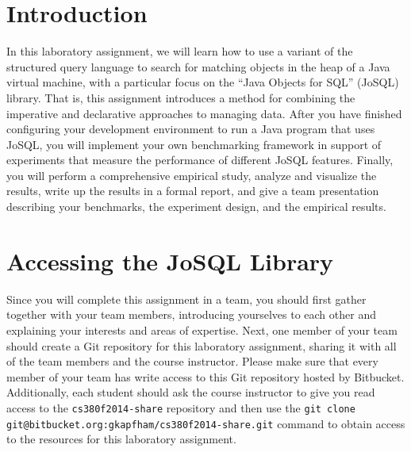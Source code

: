 


\usepackage[compact]{titlesec}



\section*{Introduction}

In this laboratory assignment, we will learn how to use a variant of the structured query language to search for
matching objects in the heap of a Java virtual machine, with a particular focus on the ``Java Objects for SQL'' (JoSQL)
library. That is, this assignment introduces a method for combining the imperative and declarative approaches to
managing data. After you have finished configuring your development environment to run a Java program that uses JoSQL,
you will implement your own benchmarking framework in support of experiments that measure the performance of
different JoSQL features.  Finally, you will perform a comprehensive empirical study, analyze and visualize the results,
write up the results in a formal report, and give a team presentation describing your benchmarks, the experiment
design, and the empirical results.

\section*{Accessing the JoSQL Library}

Since you will complete this assignment in a team, you should first gather together with your team members, introducing
yourselves to each other and explaining your interests and areas of expertise. Next, one member of your team should
create a Git repository for this laboratory assignment, sharing it with all of the team members and the course
instructor. Please make sure that every member of your team has write access to this Git repository hosted by Bitbucket.
Additionally, each student should ask the course instructor to give you read access to the {\tt cs380f2014-share}
repository and then use the {\tt git clone git@bitbucket.org:gkapfham/cs380f2014-share.git} command to obtain access to
the resources for this laboratory assignment.

